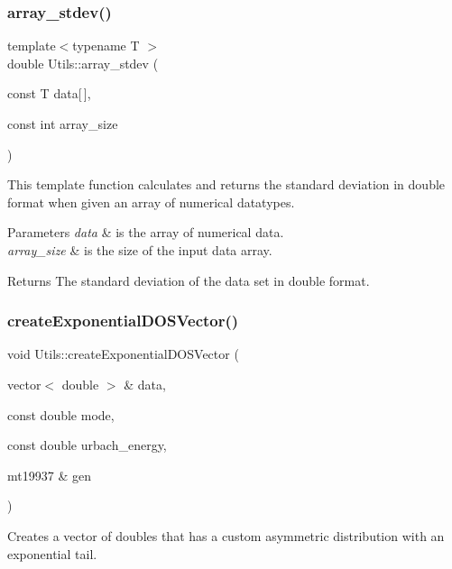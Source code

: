\subsubsection{\texorpdfstring{array\+\_\+stdev()}{array\_stdev()}}
{\footnotesize\ttfamily template$<$typename T $>$ \\
double Utils\+::array\+\_\+stdev (\begin{DoxyParamCaption}\item[{const T}]{data\mbox{[}$\,$\mbox{]},  }\item[{const int}]{array\+\_\+size }\end{DoxyParamCaption})}



This template function calculates and returns the standard deviation in double format when given an array of numerical datatypes. 


\begin{DoxyParams}{Parameters}
{\em data} & is the array of numerical data. \\
\hline
{\em array\+\_\+size} & is the size of the input data array. \\
\hline
\end{DoxyParams}
\begin{DoxyReturn}{Returns}
The standard deviation of the data set in double format. 
\end{DoxyReturn}
\mbox{\label{namespace_utils_ad895b1edcec8254af3279938d0ed4ac0}} 
\subsubsection{\texorpdfstring{create\+Exponential\+D\+O\+S\+Vector()}{createExponentialDOSVector()}}
{\footnotesize\ttfamily void Utils\+::create\+Exponential\+D\+O\+S\+Vector (\begin{DoxyParamCaption}\item[{vector$<$ double $>$ \&}]{data,  }\item[{const double}]{mode,  }\item[{const double}]{urbach\+\_\+energy,  }\item[{mt19937 \&}]{gen }\end{DoxyParamCaption})}



Creates a vector of doubles that has a custom asymmetric distribution with an exponential tail. 

